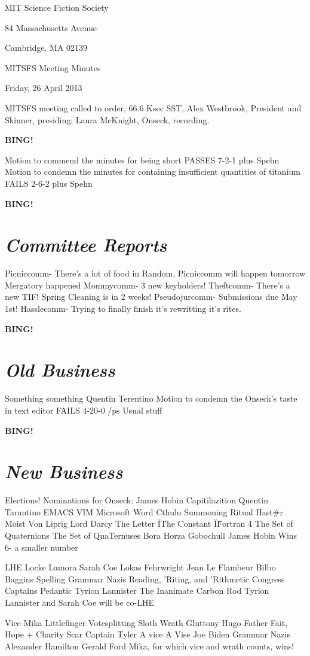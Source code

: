 \documentclass[10pt]{article}
\newcommand{\bing}{{\bf BING!} }
\newcommand{\goto}[1]{\bing \vskip 12pt \section*{{\em{#1}}}}
\newcommand{\ps}{ plus Spehn\xspace}
\newcommand{\skinner}{Alex Westbrook, President and Skinner}
\newcommand{\onseck}{Laura McKnight, Onseck}
\newcommand{\meetingdate}{Friday, 26 April 2013}
\begin{document}
\begin{center}

MIT Science Fiction Society

84 Massachusetts Avenue

Cambridge, MA 02139

\vspace{12pt}

MITSFS Meeting Minutes

\meetingdate

\end{center}

\vspace{18pt}

\setlength{\parskip}{6pt}

\noindent
MITSFS meeting called to order, 66.6 Ksec SST,
\skinner, presiding; \onseck, recording.

\bing

Motion to commend the minutes for being short PASSES 7-2-1\ps
Motion to condemn the minutes for containing insufficient quantities of titanium FAILS 2-6-2\ps

\goto{Committee Reports}
Picniccomm- There's a lot of food in Random, Picniccomm will happen tomorrow
Mergatory happened
Mommycomm- 3 new keyholders!
Theftcomm- There's a new TIF!
Spring Cleaning is in 2 weeks!
Pseudojurcomm- Submissions due May 1st!
Hasslecomm- Trying to finally finish it's rewritting it's rites.



\goto{Old Business}
Something something Quentin Terentino
Motion to condemn the Onseck's taste in text editor FAILS 4-20-0 /ps
Usual stuff

\goto{New Business}
Elections!
Nominations for Onseck:
James Hobin
Capitilazition
Quentin Tarantino
EMACS
VIM
Microsoft Word
Cthulu Summoning Ritual
Hast#r
Moist Von Liprig
Lord Darcy
The Letter \"I\"
The Constant \"I\"
Fortran 4
The Set of Quaternions
The Set of QuaTernuses
Bora Horza Gobochull
James Hobin Wins 6- a smaller number

LHE
Locke Lamora
Sarah Coe
Lokas Fehrwright
Jean Le Flambeur
Bilbo Baggins
Spelling
Grammar Nazis
Reading, 'Riting, and 'Rithmetic
Congress
Captains Pedantic
Tyrion Lannister
The Inanimate Carbon Rod
Tyrion Lannister and Sarah Coe will be co-LHE

Vice
Mika
Littlefinger
Votesplitting
Sloth
Wrath
Gluttony
Hugo
Father
Fait, Hope + Charity
Scar
Captain Tyler
A vice
A Vise
Joe Biden
Grammar Nazis
Alexander Hamilton
Gerald Ford
Mika, for which vice and wrath counts, wins!
\end{document}
